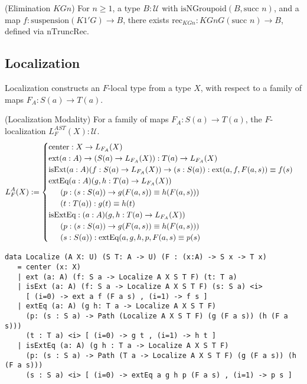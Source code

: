 \documentclass{article}
\begin{document}
\begin{theorem} (Elimination \( KGn \))
For \( n \geq 1 \), a type \( B : \mathcal{U} \) with \( \text{isNGroupoid}(B, \text{succ } n) \),
and a map \( f : \text{suspension}(K1' G) \to B \), there exists
\( \text{rec}_{KGn} : KGn G (\text{succ } n) \to B \),
defined via \( \text{nTruncRec} \).
\end{theorem}

\newpage
\subsection{Localization}
Localization constructs an \( F \)-local type from a type \( X \),
with respect to a family of maps \( F_A : S(a) \to T(a) \).

\begin{definition} (Localization Modality)
For a family of maps \( F_A : S(a) \to T(a) \),
the \( F \)-localization \( L^{AST}_F(X) : \mathcal{U} \).
\[
L^A_F(X) :=
\begin{cases}
\text{center} : X \to L_{F_A}(X) \\
\text{ext} (a : A) \to (S(a) \to L_{F_A}(X)) : T(a) \to L_{F_A}(X) \\
\text{isExt} (a : A) (f : S(a) \to L_{F_A}(X)) \to (s : S(a)) : \text{ext}(a,f,F(a,s)) \equiv f(s) \\
\text{extEq} (a : A) (g, h : T(a) \to L_{F_A}(X)) \\
\indent (p : (s : S(a)) \to g(F(a,s)) \equiv h(F(a,s))) \\
\indent (t : T(a)) : g(t) \equiv h(t) \\
\text{isExtEq} : (a : A) (g, h : T(a) \to L_{F_A}(X)) \\
\indent  (p : (s : S(a)) \to g(F(a,s)) \equiv h(F(a,s))) \\
\indent (s : S(a)) : \text{extEq}(a,g,h,p,F(a,s) \equiv p(s)
\end{cases}
\]
\begin{lstlisting}
data Localize (A X: U) (S T: A -> U) (F : (x:A) -> S x -> T x)
   = center (x: X)
   | ext (a: A) (f: S a -> Localize A X S T F) (t: T a)
   | isExt (a: A) (f: S a -> Localize A X S T F) (s: S a) <i>
     [ (i=0) -> ext a f (F a s) , (i=1) -> f s ]
   | extEq (a: A) (g h: T a -> Localize A X S T F)
     (p: (s : S a) -> Path (Localize A X S T F) (g (F a s)) (h (F a s)))
     (t : T a) <i> [ (i=0) -> g t , (i=1) -> h t ]
   | isExtEq (a: A) (g h : T a -> Localize A X S T F)
     (p: (s : S a) -> Path (T a -> Localize A X S T F) (g (F a s)) (h (F a s)))
     (s : S a) <i> [ (i=0) -> extEq a g h p (F a s) , (i=1) -> p s ]
\end{lstlisting}
\end{definition}
\end{document}
